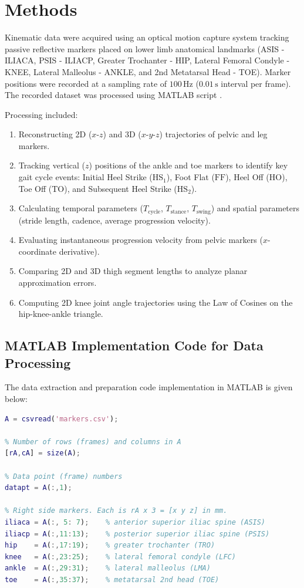 \documentclass[12pt,a4paper]{article}
\newcommand{\csvfile}[1]{\texttt{\detokenize{#1}}}
\begin{document}
\section{Methods}
Kinematic data were acquired using an optical motion capture system tracking passive reflective markers placed on lower limb anatomical landmarks (ASIS - ILIACA, PSIS - ILIACP, Greater Trochanter - HIP, Lateral Femoral Condyle - KNEE, Lateral Malleolus - ANKLE, and 2nd Metatarsal Head - TOE). Marker positions were recorded at a sampling rate of $100\,\mathrm{Hz}$ ($0.01\,\mathrm{s}$ interval per frame). The recorded dataset \csvfile{markers.csv} was processed using MATLAB script \csvfile{gait230449N.m}. 

Processing included:
\begin{enumerate}
    \item Reconstructing 2D ($x$-$z$) and 3D ($x$-$y$-$z$) trajectories of pelvic and leg markers.
    \item Tracking vertical ($z$) positions of the ankle and toe markers to identify key gait cycle events: Initial Heel Strike ($\text{HS}_1$), Foot Flat ($\text{FF}$), Heel Off ($\text{HO}$), Toe Off ($\text{TO}$), and Subsequent Heel Strike ($\text{HS}_2$).
    \item Calculating temporal parameters ($T_{\text{cycle}}$, $T_{\text{stance}}$, $T_{\text{swing}}$) and spatial parameters (stride length, cadence, average progression velocity).
    \item Evaluating instantaneous progression velocity from pelvic markers ($x$-coordinate derivative).
    \item Comparing 2D and 3D thigh segment lengths to analyze planar approximation errors.
    \item Computing 2D knee joint angle trajectories using the Law of Cosines on the hip-knee-ankle triangle.
\end{enumerate}

\subsection{MATLAB Implementation Code for Data Processing}
The data extraction and preparation code implementation in MATLAB is given below:

\begin{lstlisting}[language=Matlab, caption={Data initialization and setup in MATLAB (\csvfile{gait230449N.m})}]
% Load the data into array A (marker data)
A = csvread('markers.csv');

% Number of rows (frames) and columns in A
[rA,cA] = size(A);

% Data point (frame) numbers
datapt = A(:,1);

% Right side markers. Each is rA x 3 = [x y z] in mm.
iliaca = A(:, 5: 7);    % anterior superior iliac spine (ASIS)
iliacp = A(:,11:13);    % posterior superior iliac spine (PSIS)
hip    = A(:,17:19);    % greater trochanter (TRO)
knee   = A(:,23:25);    % lateral femoral condyle (LFC)
ankle  = A(:,29:31);    % lateral malleolus (LMA)
toe    = A(:,35:37);    % metatarsal 2nd head (TOE)
\end{lstlisting}
\end{document}
